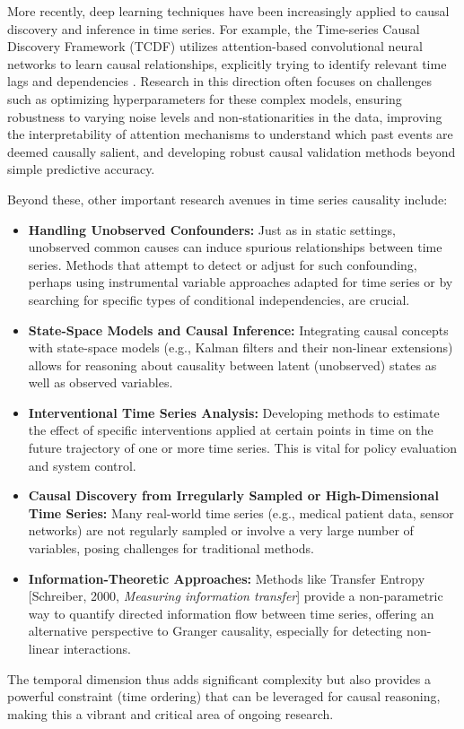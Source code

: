 More recently, deep learning techniques have been increasingly applied to causal discovery and inference in time series. For example, the Time-series Causal Discovery Framework (TCDF) utilizes attention-based convolutional neural networks to learn causal relationships, explicitly trying to identify relevant time lags and dependencies \cite{Nauta2019Causal}. Research in this direction often focuses on challenges such as optimizing hyperparameters for these complex models, ensuring robustness to varying noise levels and non-stationarities in the data, improving the interpretability of attention mechanisms to understand which past events are deemed causally salient, and developing robust causal validation methods beyond simple predictive accuracy.

\newpage

Beyond these, other important research avenues in time series causality include:
\begin{itemize}
    \item \textbf{Handling Unobserved Confounders:} Just as in static settings, unobserved common causes can induce spurious relationships between time series. Methods that attempt to detect or adjust for such confounding, perhaps using instrumental variable approaches adapted for time series or by searching for specific types of conditional independencies, are crucial.
    \item \textbf{State-Space Models and Causal Inference:} Integrating causal concepts with state-space models (e.g., Kalman filters and their non-linear extensions) allows for reasoning about causality between latent (unobserved) states as well as observed variables.
    \item \textbf{Interventional Time Series Analysis:} Developing methods to estimate the effect of specific interventions applied at certain points in time on the future trajectory of one or more time series. This is vital for policy evaluation and system control.
    \item \textbf{Causal Discovery from Irregularly Sampled or High-Dimensional Time Series:} Many real-world time series (e.g., medical patient data, sensor networks) are not regularly sampled or involve a very large number of variables, posing challenges for traditional methods.
    \item \textbf{Information-Theoretic Approaches:} Methods like Transfer Entropy [Schreiber, 2000, \textit{Measuring information transfer}] provide a non-parametric way to quantify directed information flow between time series, offering an alternative perspective to Granger causality, especially for detecting non-linear interactions.
\end{itemize}
The temporal dimension thus adds significant complexity but also provides a powerful constraint (time ordering) that can be leveraged for causal reasoning, making this a vibrant and critical area of ongoing research.

